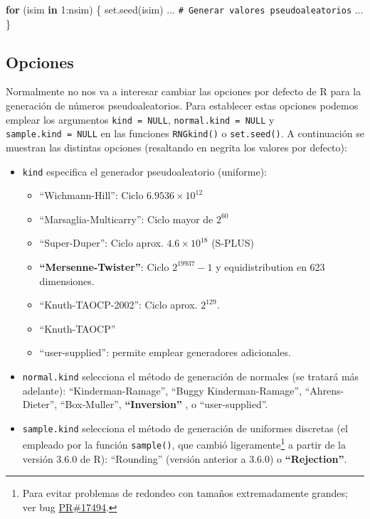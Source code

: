 \documentclass[
]{book}
\newenvironment{Shaded}{\begin{snugshade}}{\end{snugshade}}
\newcommand{\CommentTok}[1]{\textcolor[rgb]{0.56,0.35,0.01}{\textit{#1}}}
\newcommand{\ControlFlowTok}[1]{\textcolor[rgb]{0.13,0.29,0.53}{\textbf{#1}}}
\newcommand{\DecValTok}[1]{\textcolor[rgb]{0.00,0.00,0.81}{#1}}
\newcommand{\FunctionTok}[1]{\textcolor[rgb]{0.00,0.00,0.00}{#1}}
\newcommand{\NormalTok}[1]{#1}
\newcommand{\SpecialCharTok}[1]{\textcolor[rgb]{0.00,0.00,0.00}{#1}}
\theoremstyle{break}
\theoremstyle{nonumberplain}
\renewcommand{\CommentTok}[1]{\textcolor[rgb]{0.41,0.41,0.41}{\texttt{#1}}}
\begin{document}
\begin{Shaded}
\begin{Highlighting}[]
\ControlFlowTok{for}\NormalTok{ (isim }\ControlFlowTok{in} \DecValTok{1}\SpecialCharTok{:}\NormalTok{nsim) \{}
  \FunctionTok{set.seed}\NormalTok{(isim)}
\NormalTok{  ...}
  \CommentTok{\# Generar valores pseudoaleatorios}
\NormalTok{  ...}
\NormalTok{\}}
\end{Highlighting}
\end{Shaded}

\hypertarget{oprrng}{%
\subsection{Opciones}\label{oprrng}}

Normalmente no nos va a interesar cambiar las opciones por defecto de R para la generación de números pseudoaleatorios.
Para establecer estas opciones podemos emplear los argumentos \texttt{kind\ =\ NULL}, \texttt{normal.kind\ =\ NULL} y \texttt{sample.kind\ =\ NULL} en las funciones \texttt{RNGkind()} o \texttt{set.seed()}.
A continuación se muestran las distintas opciones (resaltando en negrita los valores por defecto):

\begin{itemize}
\item
  \texttt{kind} especifica el generador pseudoaleatorio (uniforme):

  \begin{itemize}
  \item
    ``Wichmann-Hill'': Ciclo \(6.9536\times10^{12}\)
  \item
    ``Marsaglia-Multicarry'': Ciclo mayor de \(2^{60}\)
  \item
    ``Super-Duper'': Ciclo aprox. \(4.6\times10^{18}\) (S-PLUS)
  \item
    \textbf{``Mersenne-Twister''}: Ciclo \(2^{19937}-1\) y equidistribution
    en 623 dimensiones.
  \item
    ``Knuth-TAOCP-2002'': Ciclo aprox. \(2^{129}\).
  \item
    ``Knuth-TAOCP''
  \item
    ``user-supplied'': permite emplear generadores adicionales.
  \end{itemize}
\item
  \texttt{normal.kind} selecciona el método de generación de normales
  (se tratará más adelante):
  ``Kinderman-Ramage'', ``Buggy Kinderman-Ramage'',
  ``Ahrens-Dieter'', ``Box-Muller'', \textbf{``Inversion''} , o ``user-supplied''.
\item
  \texttt{sample.kind} selecciona el método de generación de uniformes discretas (el empleado por la función \texttt{sample()}, que cambió ligeramente\footnote{Para evitar problemas de redondeo con tamaños extremadamente grandes; ver bug \href{https://bugs.r-project.org/bugzilla3/show_bug.cgi?id=17494}{PR\#17494}.} a partir de la versión 3.6.0 de R): ``Rounding'' (versión anterior a 3.6.0) o \textbf{``Rejection''}.
\end{itemize}
\end{document}
